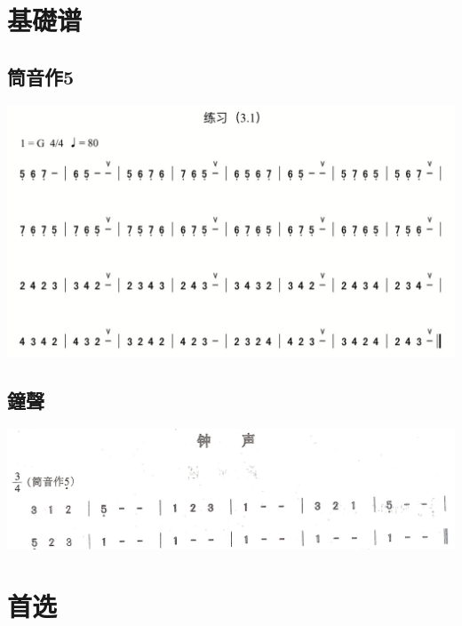 \documentclass[cn,pad,chinesefont=nofont,twocol]{elegantbook}
\begin{document}
\chapter{基礎谱}
\section{筒音作5}
\begin{center}
	\includegraphics[width=\textwidth]{dongxiao/20200419-练习3.1.png}
\end{center}
\section{鐘聲}
	\includegraphics[width=\textwidth]{dongxiao/20200711-钟声.jpg}

\chapter{首选}
\end{document}
